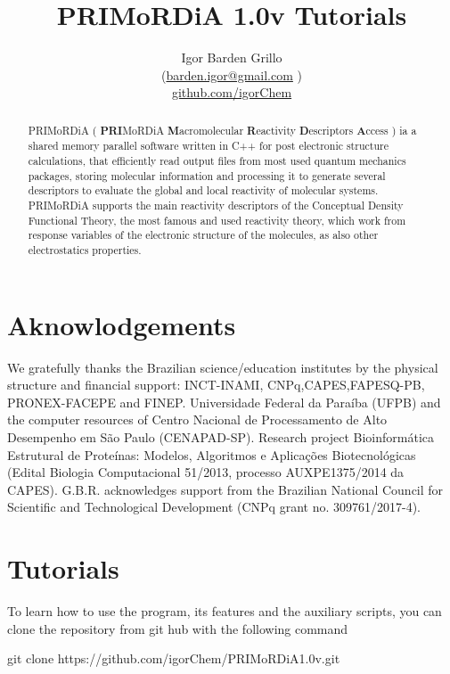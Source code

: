 \documentclass[a4paper,11pt]{refart}
\title{PRIMoRDiA 1.0v Tutorials}
\author{Igor Barden Grillo \\(\url{barden.igor@gmail.com} )\\\url{github.com/igorChem}}
\begin{document}
	\maketitle
	
\begin{abstract}
	PRIMoRDiA ( \textbf{PRI}MoRDiA \textbf{M}acromolecular \textbf{R}eactivity \textbf{D}escriptors \textbf{A}ccess ) ia a shared memory parallel software written in C++ for post electronic structure calculations, that efficiently read output files from most used quantum mechanics packages, storing molecular information and processing it to generate several descriptors to evaluate the global and local reactivity of molecular systems. PRIMoRDiA supports the main reactivity descriptors of the Conceptual Density Functional Theory, the most famous and used reactivity theory, which work from response variables of the electronic structure of the molecules, as also other electrostatics properties.
\end{abstract}
\newpage
\section*{Aknowlodgements}

We gratefully thanks the Brazilian science/education institutes by the physical structure and financial support: INCT-INAMI, CNPq,CAPES,FAPESQ-PB, PRONEX-FACEPE and FINEP. Universidade Federal da Paraíba (UFPB) and the computer resources of Centro Nacional de Processamento de Alto Desempenho em São Paulo (CENAPAD-SP). 		
Research project Bioinformática Estrutural de Proteínas: Modelos, Algoritmos e Aplicações Biotecnológicas (Edital Biologia Computacional 51/2013, processo AUXPE1375/2014 da CAPES). G.B.R. acknowledges support from the Brazilian National Council for Scientific and Technological Development (CNPq grant no. 309761/2017-4).

\section{Tutorials}

To learn how to use the program, its features and the auxiliary scripts, you can clone the repository from git hub with the following command

\hspace*{-\leftmarginwidth}
\begin{minipage}{\fullwidth}
	\begin{commandshell}git clone https://github.com/igorChem/PRIMoRDiA1.0v.git\end{commandshell}
\end{minipage}
\end{document}
